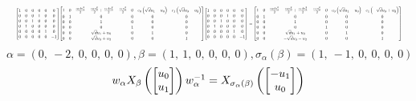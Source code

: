 \documentclass[11pt]{article}
\theoremstyle{definition}
\begin{document}
\[
\scaletoalign{\textwidth}{{\left[\begin{matrix}1 & 0 & 0 & 0 & 0 & 0\\0 & 0 & 0 & 1 & 0 & 0\\0 & 0 & 1 & 0 & 0 & 0\\0 & 1 & 0 & 0 & 0 & 0\\0 & 0 & 0 & 0 & 1 & 0\\0 & 0 & 0 & 0 & 0 & -1\end{matrix}\right]} {\left[\begin{matrix}1 & 0 & \frac{c_{0} d u_{1}^{2}}{2} - \frac{c_{0} u_{0}^{2}}{2} + \frac{c_{1} d u_{3}^{2}}{2} - \frac{c_{1} u_{2}^{2}}{2} & 0 & c_{0} \left(\sqrt{d} u_{1} - u_{0}\right) & c_{1} \left(\sqrt{d} u_{3} - u_{2}\right)\\0 & 1 & 0 & 0 & 0 & 0\\0 & 0 & 1 & 0 & 0 & 0\\0 & 0 & 0 & 1 & 0 & 0\\0 & 0 & \sqrt{d} u_{1} + u_{0} & 0 & 1 & 0\\0 & 0 & \sqrt{d} u_{3} + u_{2} & 0 & 0 & 1\end{matrix}\right]} {\left[\begin{matrix}1 & 0 & 0 & 0 & 0 & 0\\0 & 0 & 0 & 1 & 0 & 0\\0 & 0 & 1 & 0 & 0 & 0\\0 & 1 & 0 & 0 & 0 & 0\\0 & 0 & 0 & 0 & 1 & 0\\0 & 0 & 0 & 0 & 0 & -1\end{matrix}\right]} = {\left[\begin{matrix}1 & 0 & \frac{c_{0} d u_{1}^{2}}{2} - \frac{c_{0} u_{0}^{2}}{2} + \frac{c_{1} d u_{3}^{2}}{2} - \frac{c_{1} u_{2}^{2}}{2} & 0 & c_{0} \left(\sqrt{d} u_{1} - u_{0}\right) & c_{1} \left(- \sqrt{d} u_{3} + u_{2}\right)\\0 & 1 & 0 & 0 & 0 & 0\\0 & 0 & 1 & 0 & 0 & 0\\0 & 0 & 0 & 1 & 0 & 0\\0 & 0 & \sqrt{d} u_{1} + u_{0} & 0 & 1 & 0\\0 & 0 & - \sqrt{d} u_{3} - u_{2} & 0 & 0 & 1\end{matrix}\right]}}
\]
\[
\alpha = \left( 0, \  -2, \  0, \  0, \  0, \  0\right), \beta = \left( 1, \  1, \  0, \  0, \  0, \  0\right), \sigma_{\alpha}(\beta) = \left( 1, \  -1, \  0, \  0, \  0, \  0\right)
\]
\[
\scaletoalign{\textwidth}{w_{\alpha} X_{\beta}\left(\left[\begin{matrix}u_{0}\\u_{1}\end{matrix}\right]\right) w_{\alpha}^{-1} = X_{\sigma_{\alpha}\left(\beta\right)}\left(\left[\begin{matrix}- u_{1}\\u_{0}\end{matrix}\right]\right)}
\]
\end{document}

